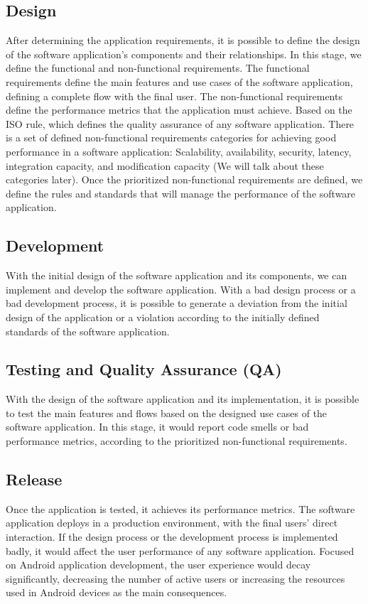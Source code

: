\subsection{Design}
After determining the application requirements, it is possible to define the design of the software application's components and their relationships. In this stage, we define the functional and non-functional requirements. The functional requirements define the main features and use cases of the software application, defining a complete flow with the final user. The non-functional requirements define the performance metrics that the application must achieve. Based on the ISO rule, which defines the quality assurance of any software application. There is a set of defined non-functional requirements categories for achieving good performance in a software application: Scalability, availability, security, latency, integration capacity, and modification capacity (We will talk about these categories later). Once the prioritized non-functional requirements are defined, we define the rules and standards that will manage the performance of the software application.

\subsection{Development}
With the initial design of the software application and its components, we can implement and develop the software application. With a bad design process or a bad development process, it is possible to generate a deviation from the initial design of the application or a violation according to the initially defined standards of the software application.

\subsection{Testing and Quality Assurance (QA)}
With the design of the software application and its implementation, it is possible to test the main features and flows based on the designed use cases of the software application. In this stage, it would report code smells or bad performance metrics, according to the prioritized non-functional requirements.

\subsection{Release}
Once the application is tested, it achieves its performance metrics. The software application deploys in a production environment, with the final users' direct interaction. If the design process or the development process is implemented badly, it would affect the user performance of any software application. Focused on Android application development, the user experience would decay significantly, decreasing the number of active users or increasing the resources used in Android devices as the main consequences.

